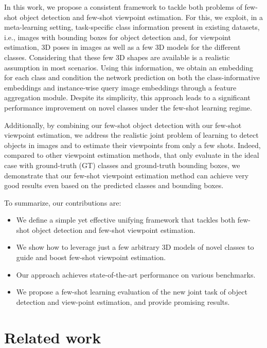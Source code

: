 \documentclass[runningheads]{llncs}
\begin{document}
In this work, we propose a consistent framework to tackle both problems of few-shot object detection and few-shot viewpoint estimation. 
For this, we exploit, in a meta-learning setting, task-specific class information present in existing datasets, i.e., images with bounding boxes for object detection and, for viewpoint estimation, 3D poses in images as well as a few 3D models for the different classes.  
Considering that these few 3D shapes are available is a realistic assumption in most scenarios.
Using this information, we obtain an embedding for each class and condition the network prediction on both the class-informative embeddings and instance-wise query image embeddings through a feature aggregation module.
Despite its simplicity, this approach leads to a significant performance improvement on novel classes under the few-shot learning regime.

Additionally, by combining our few-shot object detection with our few-shot viewpoint estimation, we address the realistic joint problem of learning to detect objects in images and to estimate their viewpoints from only a few shots.
Indeed, compared to other viewpoint estimation methods, that only evaluate in the ideal case with ground-truth (GT) classes and ground-truth bounding boxes, we demonstrate that our few-shot viewpoint estimation method can achieve very good results even based on the predicted classes and bounding boxes.

To summarize, our contributions are:
\begin{itemize}[nosep]
    \item We define a simple yet effective unifying framework that tackles both few-shot object detection and few-shot viewpoint estimation.
    \item We show how to leverage just a few arbitrary 3D models of novel classes to guide and boost few-shot viewpoint estimation.
    \item Our approach achieves state-of-the-art performance on various benchmarks.
    \item We propose a few-shot learning evaluation of the new joint task of object detection and view-point estimation, and provide promising results.
\end{itemize}



\section{Related work}
\end{document}
